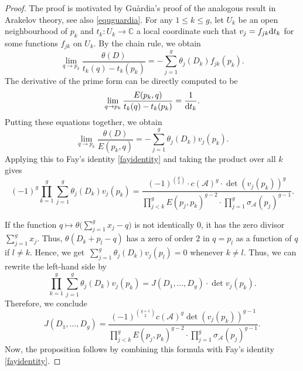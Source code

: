 \documentclass[pdftex]{sigma}
\numberwithin{equation}{section}
\begin{document}
\begin{proof}
	The proof is motivated by Gu\`ardia's proof \cite{Gua99} of the analogous result in Arakelov theory, see also \eqref{equguardia}.
	For any $1\le k\le g$, let $U_k$ be an open neighbourhood of $p_k$ and $t_k\colon U_k\to \mathbb{C}$ a local coordinate such that $v_j=f_{jk}{\rm d}t_k$ for some functions $f_{jk}$ on $U_k$. By the chain rule, we obtain
	\[\lim_{q\to p_k}\frac{\theta(D)}{t_k(q)-t_k(p_k)}=-\sum_{j=1}^g\theta_j(D_k)f_{jk}(p_k).\]
	The derivative of the prime form can be directly computed to be
	\begin{align}\label{derivE}
		\lim_{q\to p_k} \frac{E(p_k,q)}{t_k(q)-t_k(p_k)}=\frac{1}{{\rm d}t_k}.
	\end{align}
	Putting these equations together, we obtain
	\[\lim_{q\to p_k}\frac{\theta(D)}{E(p_k,q)}=-\sum_{j=1}^g\theta_j(D_k)v_j(p_k).\]
	Applying this to Fay's identity \eqref{fayidentity} and taking the product over all $k$ gives
	\[(-1)^g\prod_{k=1}^g\sum_{j=1}^g\theta_j(D_k)v_j(p_k)=\frac{(-1)^{\binom{g}{2}}\cdot c(\mathcal{A})^g\cdot\det(v_j(p_k))^g}{\prod_{j<k}^{g}E(p_j,p_k)^{g-2}\cdot\prod_{j=1}^g\sigma_{\mathcal{A}}(p_j)^{g-1}}.\]
	
	If the function $q\mapsto\theta\bigl(\sum_{j=1}^g x_j-q\bigr)$ is not identically $0$, it has the zero divisor $\sum_{j=1}^g x_j$. Thus, $\theta(D_k+p_l-q)$ has a zero of order $2$ in $q=p_l$ as a function of $q$ if $l\neq k$. Hence, we get~${\sum_{j=1}^g \theta_j(D_k)v_j(p_l)=0}$ whenever $k\neq l$. Thus, we can rewrite the left-hand side by
	\[\prod_{k=1}^g\sum_{j=1}^g\theta_j(D_k)v_j(p_k)=J(D_1,\dots,D_g)\cdot \det v_j(p_k).\]
	Therefore, we conclude
	\[J(D_1,\dots,D_g)=\frac{(-1)^{\binom{g+1}{2}}c(\mathcal{A})^g\det(v_j(p_k))^{g-1}}{\prod_{j<k}^{g}E(p_j,p_k)^{g-2}\cdot\prod_{j=1}^g\sigma_{\mathcal{A}}(p_j)^{g-1}}.\]
	Now, the proposition follows by combining this formula with Fay's identity \eqref{fayidentity}.
\end{proof}
\end{document}
